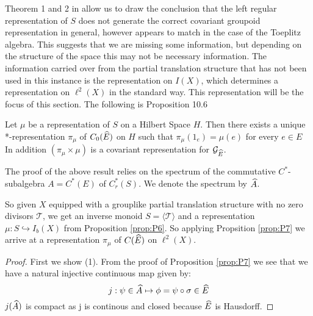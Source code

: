 \begin{corollary}
Theorem 1 and 2 in \cite{MR2457037} allow us to draw the conclusion that the left regular representation of $S$ does not generate the correct covariant groupoid representation in general, however appears to match in the case of the Toeplitz algebra. This suggests that we are missing some information, but depending on the structure of the space this may not be necessary information. The information carried over from the partial translation structure that has not been used in this instance is the representation on $I(X)$, which determines a representation on $\ell^{2}(X)$ in the standard way. This representation will be the focus of this section. The following is Proposition 10.6 \cite{MR2419901}

\begin{proposition}\label{prop:P7} 
Let $\mu$ be a representation of $S$ on a Hilbert Space $H$. Then there exists a unique *-representation $\pi_{\mu}$ of $C_{0}(\widehat{E})$ on $H$ such that $\pi_{\mu}(1_{e})=\mu(e)$ for every $e \in E$ In addition $(\pi_{\mu} \times \mu)$ is a covariant representation for $\mathcal{G}_{\widehat{E}}$. 
\end{proposition}

The proof of the above result relies on the spectrum of the commutative $C^{*}$-subalgebra $A=C^{*}(E)$ of $C^{*}_{r}(S)$. We denote the spectrum by $\widehat{A}$.

So given $X$ equipped with a grouplike partial translation structure with no zero divisors $\mathcal{T}$, we get an inverse monoid $S=\langle \mathcal{T} \rangle$ and a representation $\mu: S \hookrightarrow I_{b}(X)$ from Proposition \ref{prop:P6}. So applying Propsition \ref{prop:P7} we arrive at a representation $\pi_{\mu}$ of $C(\widehat{E})$ on $\ell^{2}(X)$. 

\begin{proof}
First we show (1). From the proof of Proposition \ref{prop:P7} we see that we have a natural injective continuous map given by: 
\begin{equation*}
j: \psi \in \widehat{A} \mapsto \phi = \psi \circ \sigma \in \widehat{E}
\end{equation*}
$j(\widehat{A})$ is compact as j is continous and closed because $\widehat{E}$ is Hausdorff.


\end{proof}
\end{corollary}
